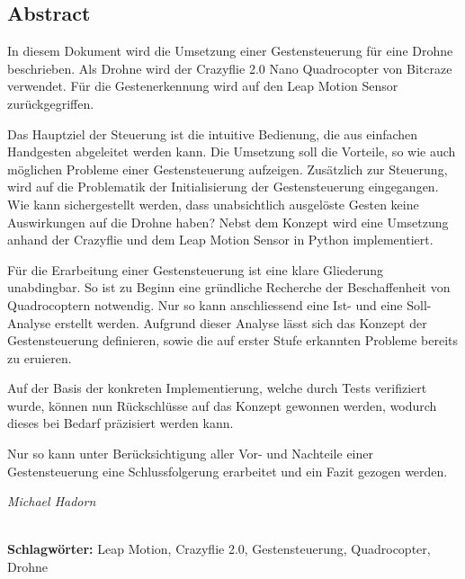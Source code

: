 
\subsection*{Abstract}
In diesem Dokument wird die Umsetzung einer Gestensteuerung für eine Drohne beschrieben. Als Drohne wird der Crazyflie 2.0 Nano Quadrocopter von Bitcraze verwendet. Für die Gestenerkennung wird auf den Leap Motion Sensor zurückgegriffen.

Das Hauptziel der Steuerung ist die intuitive Bedienung, die aus einfachen Handgesten abgeleitet werden kann. Die Umsetzung soll die Vorteile, so wie auch möglichen Probleme einer Gestensteuerung aufzeigen. Zusätzlich zur Steuerung, wird auf die Problematik der Initialisierung der Gestensteuerung eingegangen. Wie kann sichergestellt werden, dass unabsichtlich ausgelöste Gesten keine Auswirkungen auf die Drohne haben? Nebst dem Konzept wird eine Umsetzung anhand der Crazyflie und dem Leap Motion Sensor in Python implementiert.

Für die Erarbeitung einer Gestensteuerung ist eine klare Gliederung unabdingbar. So ist zu Beginn eine gründliche Recherche der Beschaffenheit von Quadrocoptern notwendig. Nur so kann anschliessend eine Ist- und eine Soll-Analyse erstellt werden. Aufgrund dieser Analyse lässt sich das Konzept der Gestensteuerung definieren, sowie die auf erster Stufe erkannten Probleme bereits zu eruieren.

Auf der Basis der konkreten Implementierung, welche durch Tests verifiziert wurde, können nun Rückschlüsse auf das Konzept gewonnen werden, wodurch dieses bei Bedarf präzisiert werden kann.

Nur so kann unter Berücksichtigung aller Vor- und Nachteile einer Gestensteuerung eine Schlussfolgerung erarbeitet und ein Fazit gezogen werden.

\begin{flushright}
	\textit{Michael Hadorn}	
\end{flushright}

\vfill

%
\mbox{}\\[0.5\baselineskip]\noindent
\textbf{Schlagwörter:} 
Leap Motion, Crazyflie 2.0, Gestensteuerung, Quadrocopter, Drohne

